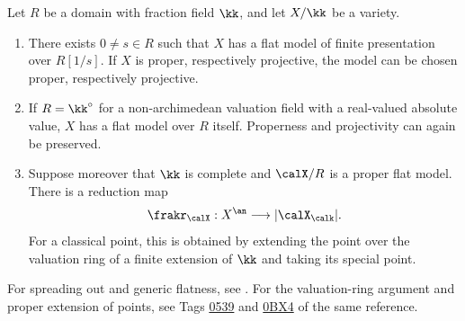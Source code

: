 \begin{proposition}[label=\labelNFM{prop:spreading-out-for-berkovich}, status=draft, tag=0000000]
	\begin{latexmathchange}
	Let $R$ be a domain with fraction field $\kk$, and let $X/\kk$ be a variety.
	\begin{enumerate}
		\item There exists $0 \neq s \in R$ such that $X$ has a flat model of finite presentation over $R[1/s]$.
		      If $X$ is proper, respectively projective, the model can be chosen proper, respectively projective.
		\item If $R = \kk^\circ$ for a non-archimedean valuation field with a real-valued absolute value, $X$ has a flat model over $R$ itself.
		      Properness and projectivity can again be preserved.
		\item Suppose moreover that $\kk$ is complete and $\calX/R$ is a proper flat model.
		      There is a reduction map
		      \[ \frakr_\calX : X^\an \longrightarrow |\calX_\calk|. \]
		      For a classical point, this is obtained by extending the point over the valuation ring of a finite extension of $\kk$ and taking its special point.
	\end{enumerate}
	For spreading out and generic flatness, see \cite[Tags \href{https://stacks.math.columbia.edu/tag/01ZM}{01ZM}, \href{https://stacks.math.columbia.edu/tag/051S}{051S}]{Stacksprojectauthors-2026-StacksProject}.
	For the valuation-ring argument and proper extension of points, see Tags \href{https://stacks.math.columbia.edu/tag/0539}{0539} and \href{https://stacks.math.columbia.edu/tag/0BX4}{0BX4} of the same reference.
	\end{latexmathchange}
\end{proposition}
